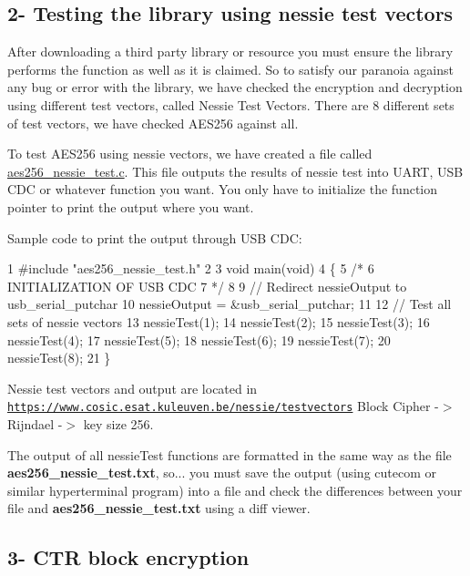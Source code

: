 \subsection*{2-\/ Testing the library using nessie test vectors }

After downloading a third party library or resource you must ensure the library performs the function as well as it is claimed. So to satisfy our paranoia against any bug or error with the library, we have checked the encryption and decryption using different test vectors, called Nessie Test Vectors. There are 8 different sets of test vectors, we have checked A\+E\+S256 against all.

To test A\+E\+S256 using nessie vectors, we have created a file called \hyperlink{aes256__nessie__test_8c}{aes256\+\_\+nessie\+\_\+test.\+c}. This file outputs the results of nessie test into U\+A\+RT, U\+SB C\+DC or whatever function you want. You only have to initialize the function pointer to print the output where you want.

Sample code to print the output through U\+SB C\+DC\+:


\begin{DoxyCode}
1 #include "aes256\_nessie\_test.h"
2 
3 void main(void)
4 \{
5     /*
6         INITIALIZATION OF USB CDC
7     */
8 
9     // Redirect nessieOutput to usb\_serial\_putchar
10     nessieOutput = &usb\_serial\_putchar;
11 
12     // Test all sets of nessie vectors
13     nessieTest(1);
14     nessieTest(2);
15     nessieTest(3);
16     nessieTest(4);
17     nessieTest(5);
18     nessieTest(6);
19     nessieTest(7);
20     nessieTest(8);
21 \}
\end{DoxyCode}


Nessie test vectors and output are located in \href{https://www.cosic.esat.kuleuven.be/nessie/testvectors}{\tt https\+://www.\+cosic.\+esat.\+kuleuven.\+be/nessie/testvectors} Block Cipher -\/$>$ Rijndael -\/$>$ key size 256.

The output of all nessie\+Test functions are formatted in the same way as the file {\bfseries aes256\+\_\+nessie\+\_\+test.\+txt}, so... you must save the output (using cutecom or similar hyperterminal program) into a file and check the differences between your file and {\bfseries aes256\+\_\+nessie\+\_\+test.\+txt} using a diff viewer.

\subsection*{3-\/ C\+TR block encryption }

